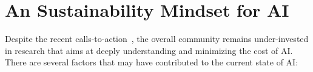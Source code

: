\documentclass{IEEEtran}
\begin{document}









\newpage
\appendix


\section{An Sustainability Mindset for AI}
\label{sec:appendix-efficiiency-mindset}

Despite the recent calls-to-action~\cite{Strubell:arxiv:2019,Lacoste:arxiv:2019,Henderson:arxiv:2020,Bender:facct:2021}, the overall community remains under-invested in research that aims at deeply understanding and minimizing the cost of AI.
There are several factors that may have contributed to the current state of AI:
\end{document}
